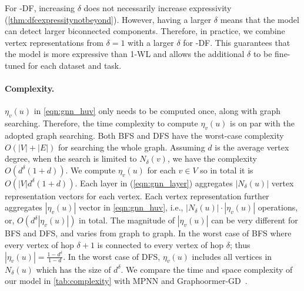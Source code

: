 For \model{}-DF, increasing $\delta$ does not necessarily increase expressivity (\cref{thm:dfcexpressitynotbeyond}). However, having a larger $\delta$ means that the model can detect larger biconnected components. Therefore, in practice, we combine vertex representations from $\delta=1$ with a larger $\delta$ for \model{}-DF. This guarantees that the model is more expressive than 1-WL and allows the additional $\delta$ to be fine-tuned for each dataset and task.




\paragraph{Complexity.}
$\eta_v(u)$ in \autoref{eqn:gnn_huv} only needs to be computed once, along with graph searching. Therefore, the time complexity to compute $\eta_v(u)$ is on par with the adopted graph searching. Both BFS and DFS have the worst-case complexity $O(|V|+|E|)$ for searching the whole graph. Assuming $d$ is the average vertex degree, when the search is limited to $N_{\delta}(v)$, we have the complexity $O({d}^{\delta}(1+{d}))$. We compute $\eta_v(u)$ for each $v\in V$ so in total it is $O(|V|{d}^{\delta}(1+{d}))$. Each layer in \model{} (\autoref{eqn:gnn_layer}) aggregates $|N_{\delta}(u)|$ vertex representation vectors for each vertex. Each vertex representation further aggregates $|\eta_v(u)|$ vector in \autoref{eqn:gnn_huv}, i.e., $|N_{\delta}(u)|\cdot|\eta_v(u)|$ operations, or, $O({d}^{\delta}|\eta_v(u)|)$ in total. The magnitude of $|\eta_v(u)|$ can be very different for BFS and DFS, and varies from graph to graph. In the worst case of BFS where every vertex of hop $\delta+1$ is connected to every vertex of hop $\delta$; thus $|\eta_v(u)| = \frac{1 - {d}^{\delta}}{1-{d}}$. In the worst case of DFS, $\eta_v(u)$ includes all vertices in $N_{\delta}(u)$ which has the size of ${d}^{\delta}$. We compare the time and space complexity of our model in \cref{tab:complexity} with MPNN and Graphoormer-GD~\citep{anonymous2023rethinking}.


